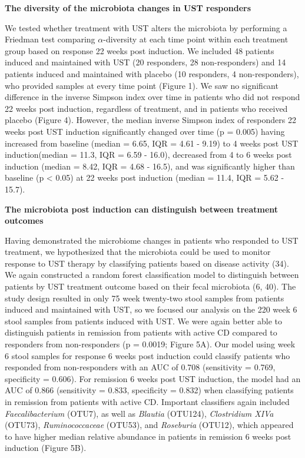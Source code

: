\documentclass[12pt,]{article}
\begin{document}
\textbf{The diversity of the microbiota changes in UST responders}

We tested whether treatment with UST alters the microbiota by performing
a Friedman test comparing \({\alpha}\)-diversity at each time point
within each treatment group based on response 22 weeks post induction.
We included 48 patients induced and maintained with UST (20 responders,
28 non-responders) and 14 patients induced and maintained with placebo
(10 responders, 4 non-responders), who provided samples at every time
point (Figure 1). We saw no significant difference in the inverse
Simpson index over time in patients who did not respond 22 weeks post
induction, regardless of treatment, and in patients who received placebo
(Figure 4). However, the median inverse Simpson index of responders 22
weeks post UST induction significantly changed over time (p = 0.005)
having increased from baseline (median = 6.65, IQR = 4.61 - 9.19) to 4
weeks post UST induction(median = 11.3, IQR = 6.59 - 16.0), decreased
from 4 to 6 weeks post induction (median = 8.42, IQR = 4.68 - 16.5), and
was significantly higher than baseline (p \textless{} 0.05) at 22 weeks
post induction (median = 11.4, IQR = 5.62 - 15.7).

\textbf{The microbiota post induction can distinguish between treatment
outcomes}

Having demonstrated the microbiome changes in patients who responded to
UST treatment, we hypothesized that the microbiota could be used to
monitor response to UST therapy by classifying patients based on disease
activity (34). We again constructed a random forest classification model
to distinguish between patients by UST treatment outcome based on their
fecal microbiota (6, 40). The study design resulted in only 75 week
twenty-two stool samples from patients induced and maintained with UST,
so we focused our analysis on the 220 week 6 stool samples from patients
induced with UST. We were again better able to distinguish patients in
remission from patients with active CD compared to responders from
non-responders (p = 0.0019; Figure 5A). Our model using week 6 stool
samples for response 6 weeks post induction could classify patients who
responded from non-responders with an AUC of 0.708 (sensitivity = 0.769,
specificity = 0.606). For remission 6 weeks post UST induction, the
model had an AUC of 0.866 (sensitivity = 0.833, specificity = 0.832)
when classifying patients in remission from patients with active CD.
Important classifiers again included \emph{Faecalibacterium} (OTU7), as
well as \emph{Blautia} (OTU124), \emph{Clostridium XIVa} (OTU73),
\emph{Ruminococcaceae} (OTU53), and \emph{Roseburia} (OTU12), which
appeared to have higher median relative abundance in patients in
remission 6 weeks post induction (Figure 5B).
\end{document}
